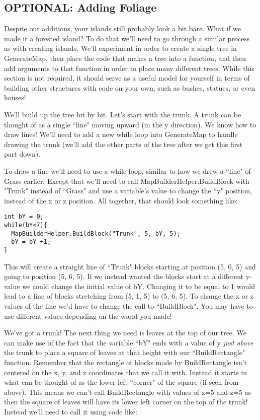 \documentclass{article}
\begin{document}
\subsection{OPTIONAL: Adding Foliage}

Despite our additions, your islands still probably look a bit bare. What if we made it a forested island? To do that we'll need to go through a similar process as with creating islands. We'll experiment in order to create a single tree in GenerateMap, then place the code that makes a tree into a function, and then add arguments to that function in order to place many different trees. While this section is not required, it should serve as a useful model for yourself in terms of building other structures with code on your own, such as bushes, statues, or even houses!

We'll build up the tree bit by bit. Let's start with the trunk. A trunk can be thought of as a single ``line" moving upward (in the y direction). We know how to draw lines! We'll need to add a new while loop into GenerateMap to handle drawing the trunk (we'll add the other parts of the tree after we get this first part down). 

To draw a line we'll need to use a while loop, similar to how we drew a ``line" of Grass earlier. Except that we'll need to call MapBuilderHelper.BuildBlock with "Trunk" instead of ``Grass" and use a variable's value to change the ``y" position, instead of the x or z position. All together, that should look something like: 

\lstset{style=sharpc}
\begin{lstlisting}
int bY = 0;
while(bY<7){
  MapBuilderHelper.BuildBlock("Trunk", 5, bY, 5);
  bY = bY +1;
}
\end{lstlisting} 

This will create a straight line of ``Trunk" blocks starting at position (5, 0, 5) and going to position (5, 6, 5). If we instead wanted the blocks start at a different y-value we could change the initial value of bY. Changing it to be equal to 1 would lead to a line of blocks stretching from (5, 1, 5) to (5, 6, 5). To change the x or z values of the line we'd have to change the call to ``BuildBlock". You may have to use different values depending on the world you made!

\noindent{}

We've got a trunk! The next thing we need is leaves at the top of our tree. We can make use of the fact that the variable ``bY" ends with a value of y \textit{just above} the trunk to place a square of leaves at that height with our ``BuildRectangle" function. Remember that the rectangle of blocks made by BuildRectangle isn't centered on the x, y, and z coordinates that we call it with. Instead it starts in what can be thought of as the lower-left ``corner" of the square (if seen from above). This means we can't call BuildRectangle with values of x=5 and z=5 as then the square of leaves will have its lower left corner on the top of the trunk! Instead we'll need to call it using code like: 
\end{document}
